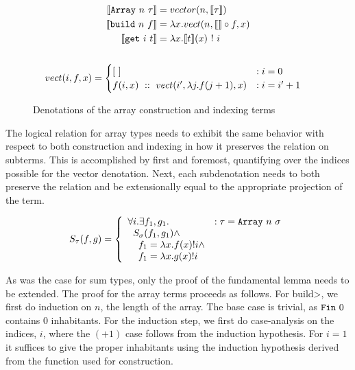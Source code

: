   \begin{figure}
    \begin{gather*}
      \begin{aligned}
      \llbracket \texttt{Array}\ n\ \tau \rrbracket &=
        vector(n, \llbracket \tau \rrbracket) \\
      \llbracket \texttt{build}\ n\ f \rrbracket &=
        \lambda x.
        vect(n, \llbracket \rrbracket \circ f, x) \\
      \llbracket \texttt{get}\ i\ t \rrbracket &=
        \lambda x. \llbracket t \rrbracket(x)\ !\ i \\
      \end{aligned}\\ \\
      \begin{aligned}
      vect(i, f, x) &=
        \begin{cases}
          [\ ]
            &: i = 0 \\
          f(i, x)\ ::\ vect(i', \lambda j. f(j + 1), x)
            &: i = i' + 1
        \end{cases}
      \end{aligned}
    \end{gather*}
    \caption{Denotations of the array construction and indexing terms}
    \label{eqn:denotation_array}
  \end{figure}

  The logical relation for array types needs to exhibit the same behavior with respect to both construction and indexing in how it preserves the relation on subterms.
  This is accomplished by first and foremost, quantifying over the indices possible for the vector denotation.
  Next, each subdenotation needs to both preserve the relation and be extensionally equal to the appropriate projection of the term.

  \begin{equation}
    S_\tau(f, g) =
      \left\{
        \begin{array}{ll}
          \forall i. \exists f_1, g_1.
            & : \tau = \texttt{Array}\ n\ \sigma \\
          \;\;S_\sigma(f_1, g_1) \wedge \\
          \;\;\;\;f_1 = \lambda x. f(x)!i \wedge \\
          \;\;\;\;f_1 = \lambda x. g(x)!i \\
        \end{array}
      \right.
  \label{eqn:lr_array}
  \end{equation}

  As was the case for sum types, only the proof of the fundamental lemma needs to be extended.
  The proof for the array terms proceeds as follows.
  For \<build>, we first do induction on $n$, the length of the array.
  The base case is trivial, as $\texttt{Fin}\ 0$ contains $0$ inhabitants.
  For the induction step, we first do case-analysis on the indices, $i$, where the $(+1)$ case follows from the induction hypothesis.
  For $i=1$ it suffices to give the proper inhabitants using the induction hypothesis derived from the function used for construction.
